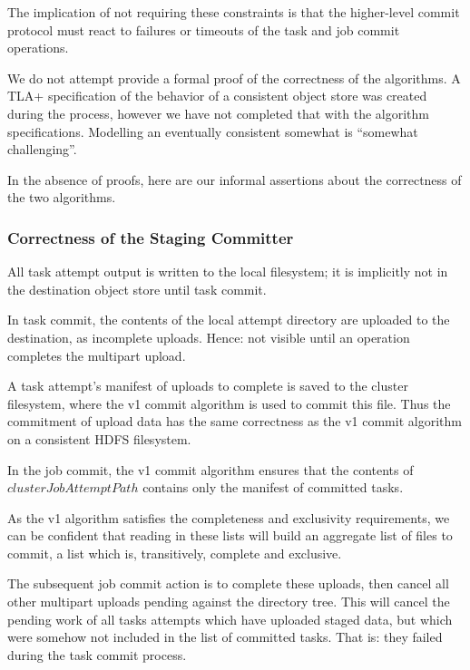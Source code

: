 \documentclass[conference]{IEEEtran}
\begin{document}
The implication of not requiring these constraints is that the higher-level
commit protocol must react to failures or timeouts of the task and job
commit operations.



We do not attempt provide a formal proof of the correctness of the algorithms.
A TLA+ specification of the behavior of a consistent object store was created
during the process, however we have not completed that with the algorithm specifications.
Modelling an eventually consistent somewhat is ``somewhat challenging''.

In the absence of proofs,
here are our informal assertions about the correctness of the two algorithms.

\subsubsection{Correctness of the Staging Committer}

All task attempt output is written to the local filesystem;
it is implicitly not in the destination object store until task commit.

In task commit, the contents of the local attempt directory are uploaded to the
destination, as incomplete uploads.
Hence: not visible until an operation completes the multipart upload.

A task attempt's manifest of uploads to complete is saved to the cluster filesystem,
where the v1 commit algorithm is used to commit this file.
Thus the commitment of upload data has the same correctness as the
v1 commit algorithm on a consistent HDFS filesystem.

In the job commit, the v1 commit algorithm ensures that the contents
of $clusterJobAttemptPath$ contains only the manifest of committed tasks.

As the v1 algorithm satisfies the completeness and exclusivity requirements,
we can be confident that reading in these lists will build an aggregate list
of files to commit, a list which is, transitively, complete and exclusive.

The subsequent job commit action is to complete these uploads,
then cancel all other multipart uploads pending against the directory tree.
This will cancel the pending work of all tasks attempts which have uploaded staged
data, but which were somehow not included in the list of committed tasks.
That is: they failed during the task commit process.
\end{document}
